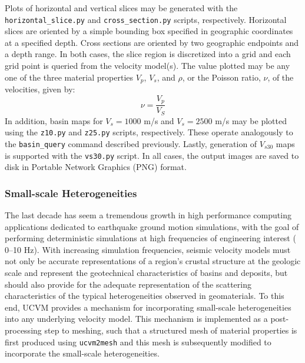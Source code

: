 Plots of horizontal and vertical slices may be generated with the \texttt{horizontal\_slice.py} and \texttt{cross\_section.py} scripts, respectively. Horizontal slices are oriented by a simple bounding box specified in geographic coordinates at a specified depth. Cross sections are oriented by two geographic endpoints and a depth range. In both cases, the slice region is discretized into a grid and each grid point is queried from the velocity model(s). The value plotted may be any one of the three material properties $V_p$, $V_s$, and $\rho$, or the Poisson ratio, $\nu$, of the velocities, given by:
\begin{equation}
\nu = \frac{V_p}{V_S}
\end{equation}
In addition, basin maps for $V_s = 1000$ m/s and $V_s = 2500$ m/s may be plotted using the \texttt{z10.py} and \texttt{z25.py} scripts, respectively. These operate analogously to the \texttt{basin\_query} command described previously. Lastly, generation of $V_{s30}$ maps is supported with the \texttt{vs30.py} script. In all cases, the output images are saved to disk in Portable Network Graphics (PNG) format.

\subsubsection{Small-scale Heterogeneities}

The last decade has seem a tremendous growth in high performance computing applications dedicated to earthquake ground motion simulations, with the goal of performing deterministic simulations at high frequencies of engineering interest (\fmax{} 0--10 Hz). With increasing simulation frequencies, seismic velocity models must not only be accurate representations of a region's crustal structure at the geologic scale and represent the geotechnical characteristics of basins and deposits, but should also provide for the adequate representation of the scattering characteristics of the typical heterogeneities observed in geomaterials. To this end, UCVM provides a mechanism for incorporating small-scale heterogeneities into any underlying velocity model. This mechanism is implemented as a post-processing step to meshing, such that a structured mesh of material properties is first produced using \texttt{ucvm2mesh} and this mesh is subsequently modified to incorporate the small-scale heterogeneities.

